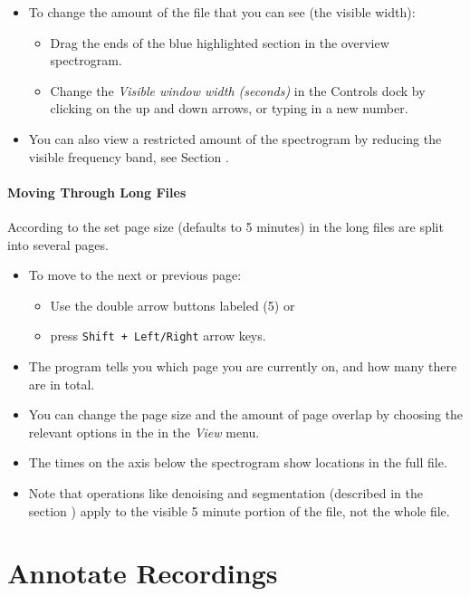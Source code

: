 \documentclass{scrartcl}
\begin{document}
\begin{itemize}
	\item To change the amount of the file that you can see (the visible width): 
	\begin{itemize}
		\item Drag the ends of the blue highlighted section in the overview spectrogram.
		\item Change the \textit{Visible window width (seconds)} in the Controls dock by clicking on the up and down arrows, or typing in a new number.
	\end{itemize}

	\item You can also view a restricted amount of the spectrogram by reducing the visible frequency band, see Section . 
\end{itemize}

\paragraph{Moving Through Long Files}\label{sec:longfiles}


According to the set page size (defaults to 5 minutes) in the \textit{} long files are split into several pages.

\begin{itemize}
	\item To move to the next or previous page: 
\begin{itemize}
	\item Use the double arrow buttons labeled (5) or
	\item press \texttt{Shift + Left/Right} arrow keys. 
\end{itemize}
	\item The program tells you which page you are currently on, and how many there are in total. 
	\item You can change the page size and the amount of page overlap by choosing the relevant options in the \textit{} in the \textit{View} menu. 
	\item The times on the axis below the spectrogram show locations in the full file.
	\item Note that operations like denoising and segmentation (described in the section ) apply to the visible 5 minute portion of the file, not the whole file.
\end{itemize}


\section{Annotate Recordings}\label{sec:ManualLabel}
\end{document}
